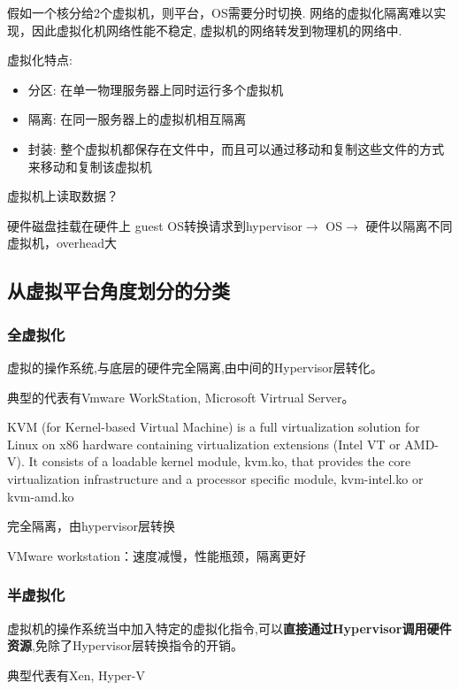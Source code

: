 假如一个核分给2个虚拟机，则平台，OS需要分时切换.️ 网络的虚拟化隔离难以实现，因此虚拟化机网络性能不稳定, 虚拟机的网络转发到物理机的网络中.

虚拟化特点:

\begin{itemize}
    \item 分区: 在单一物理服务器上同时运行多个虚拟机
    \item 隔离: 在同一服务器上的虚拟机相互隔离
    \item 封装: 整个虚拟机都保存在文件中，而且可以通过移动和复制这些文件的方式来移动和复制该虚拟机
\end{itemize}

虚拟机上读取数据？ 

硬件磁盘挂载在硬件上 guest OS转换请求到hypervisor$\rightarrow$ OS$\rightarrow$ 硬件以隔离不同虚拟机，overhead大

\subsection{从虚拟平台角度划分的分类}

\subsubsection{全虚拟化}

\begin{definition}[全虚拟化]
    虚拟的操作系统,与底层的硬件完全隔离,由中间的Hypervisor层转化。
    
    典型的代表有Vmware WorkStation, Microsoft Virtrual Server。
\end{definition}

\begin{definition}[KVM]
    KVM (for Kernel-based Virtual Machine) is a full virtualization solution for Linux on x86 hardware containing virtualization extensions (Intel VT or AMD-V). It consists of a loadable kernel module, kvm.ko, that provides the core virtualization infrastructure and a processor specific module, kvm-intel.ko or kvm-amd.ko
\end{definition}

完全隔离，由hypervisor层转换 

VMware workstation：速度减慢，性能瓶颈，隔离更好

\subsubsection{半虚拟化}

\begin{definition}[半虚拟化]
    虚拟机的操作系统当中加入特定的虚拟化指令,可以\textbf{直接通过Hypervisor调用硬件资源},免除了Hypervisor层转换指令的开销。
    
    典型代表有Xen, Hyper-V
\end{definition}

